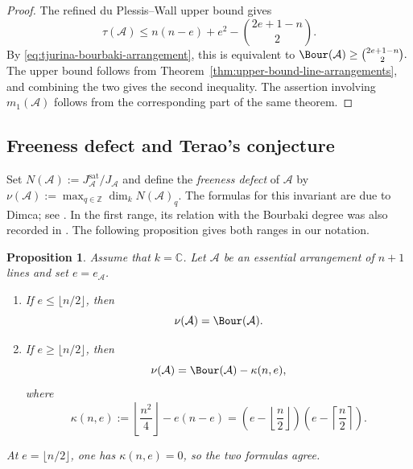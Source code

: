 \documentclass[11pt]{amsart}   %
\newtheorem{Proposition}[Theorem]{Proposition}
\theoremstyle{definition}
\def\ZZ{{\bf Z}}
\def\NZQ{\mathbb}               %
\def\ZZ{{\NZQ Z}}
\def\CC{{\NZQ C}}
\def\A{{\mathcal A}}
\begin{document}
\begin{proof}
The refined du Plessis--Wall upper bound gives
\[
\tau(\A)
\leq n(n-e)+e^2-\binom{2e+1-n}{2}.
\]
By \eqref{eq:tjurina-bourbaki-arrangement}, this is equivalent to $\Bour(\A)\geq\binom{2e+1-n}{2}.$ The upper bound follows from Theorem~\ref{thm:upper-bound-line-arrangements}, and combining the two gives the second inequality. The assertion involving $m_1(\A)$ follows from the corresponding part of the same theorem.
\end{proof}

\subsection{Freeness defect and Terao's conjecture}
\label{subsec:freeness-defect-terao}

Set $N(\A):=J_\A^{\mathrm{sat}}/J_\A$ and define the \emph{freeness defect} of $\A$ by $\nu(\A):=\max_{q\in\ZZ}\dim_kN(\A)_q$. The formulas for this invariant are due to Dimca; see \cite[Theorem~1.7]{Dimca-minimal-Tjurina}. In the first range, its relation with the Bourbaki degree was also recorded in \cite[formula~(1.11)]{Abe-Dimca-Pokora-hierarchy}. The following proposition gives both ranges in our notation.

\begin{Proposition}
\label{prop:bourbaki-freeness-defect}
Assume that $k=\CC$. Let $\A$ be an essential arrangement of $n+1$ lines and set $e=e_\A$.
\begin{enumerate}
\item[{\rm (a)}] If $e\leq\lfloor n/2\rfloor$, then
\begin{equation}
\label{eq:bourbaki-equals-freeness-defect}
\nu(\A)=\Bour(\A).
\end{equation}

\item[{\rm (b)}] If $e\geq\lfloor n/2\rfloor$, then
\[
\nu(\A)=\Bour(\A)-\kappa(n,e),
\]
where
\[
\kappa(n,e):=
\left\lfloor\frac{n^2}{4}\right\rfloor-e(n-e)
=
\left(e-\left\lfloor\frac n2\right\rfloor\right)
\left(e-\left\lceil\frac n2\right\rceil\right).
\]
\end{enumerate}
At $e=\lfloor n/2\rfloor$, one has $\kappa(n,e)=0$, so the two formulas agree.
\end{Proposition}
\end{document}
